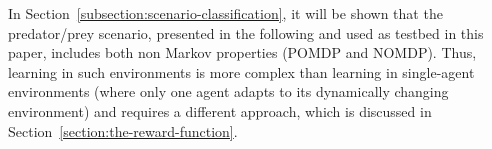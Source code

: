 In Section~\ref{subsection:scenario-classification}, it will be shown that the predator/prey scenario, presented in the following and used as testbed in this paper, includes both non Markov properties (POMDP and NOMDP). Thus, learning in such environments is more complex than learning in single-agent environments (where only one agent adapts to its dynamically changing environment) and requires a different approach, which is discussed in Section~\ref{section:the-reward-function}.
